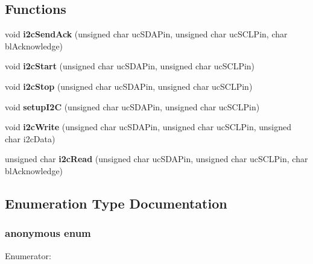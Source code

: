 \subsection*{Functions}
\begin{DoxyCompactItemize}
\item 
void {\bf i2c\-Send\-Ack} (unsigned char uc\-S\-D\-A\-Pin, unsigned char uc\-S\-C\-L\-Pin, char bl\-Acknowledge)
\item 
void {\bf i2c\-Start} (unsigned char uc\-S\-D\-A\-Pin, unsigned char uc\-S\-C\-L\-Pin)
\item 
void {\bf i2c\-Stop} (unsigned char uc\-S\-D\-A\-Pin, unsigned char uc\-S\-C\-L\-Pin)
\item 
void {\bf setup\-I2\-C} (unsigned char uc\-S\-D\-A\-Pin, unsigned char uc\-S\-C\-L\-Pin)
\item 
void {\bf i2c\-Write} (unsigned char uc\-S\-D\-A\-Pin, unsigned char uc\-S\-C\-L\-Pin, unsigned char i2c\-Data)
\item 
unsigned char {\bf i2c\-Read} (unsigned char uc\-S\-D\-A\-Pin, unsigned char uc\-S\-C\-L\-Pin, char bl\-Acknowledge)
\end{DoxyCompactItemize}


\subsection{Enumeration Type Documentation}
\subsubsection[{anonymous enum}]{\setlength{\rightskip}{0pt plus 5cm}anonymous enum}\label{i2c_8h_adf764cbdea00d65edcd07bb9953ad2b7}
\begin{Desc}
\item[Enumerator\-: ]\par
\begin{description}
\item[{\em 
I2\-C\-\_\-\-N\-O\-\_\-\-E\-R\-R\-O\-R\label{i2c_8h_adf764cbdea00d65edcd07bb9953ad2b7a0e9accb1d5f274c7dbd9c96a8178fc89}
}]\item[{\em 
I2\-C\-\_\-\-E\-R\-R\-O\-R\-\_\-\-N\-O\-\_\-\-A\-C\-K\label{i2c_8h_adf764cbdea00d65edcd07bb9953ad2b7a0275e17d7e045274d282fc85513f9243}
}]\end{description}
\end{Desc}



